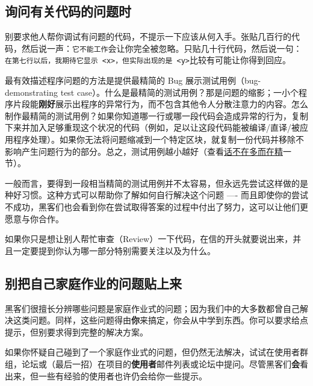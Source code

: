 \documentclass[titlepage]{article}
\begin{document}
\hypertarget{ux8be2ux95eeux6709ux5173ux4ee3ux7801ux7684ux95eeux9898ux65f6}{\subsection{询问有关代码的问题时}\label{ux8be2ux95eeux6709ux5173ux4ee3ux7801ux7684ux95eeux9898ux65f6}}

别要求他人帮你调试有问题的代码，不提示一下应该从何入手。张贴几百行的代码，然后说一声：\texttt{它不能工作}会让你完全被忽略。只贴几十行代码，然后说一句：\texttt{在第七行以后，我期待它显示\ \textless{}x\textgreater{}，但实际出现的是\ \textless{}y\textgreater{}}比较有可能让你得到回应。

最有效描述程序问题的方法是提供最精简的 Bug
展示测试用例（bug-demonstrating test
case）。什么是最精简的测试用例？那是问题的缩影；一小个程序片段能\textbf{刚好}展示出程序的异常行为，而不包含其他令人分散注意力的内容。怎么制作最精简的测试用例？如果你知道哪一行或哪一段代码会造成异常的行为，复制下来并加入足够重现这个状况的代码（例如，足以让这段代码能被编译/直译/被应用程序处理）。如果你无法将问题缩减到一个特定区块，就复制一份代码并移除不影响产生问题行为的部分。总之，测试用例越小越好（查看\protect\hyperlink{ux8bddux4e0dux5728ux591aux800cux5728ux7cbe}{话不在多而在精}一节）。

一般而言，要得到一段相当精简的测试用例并不太容易，但永远先尝试这样做的是种好习惯。这种方式可以帮助你了解如何自行解决这个问题
----
而且即使你的尝试不成功，黑客们也会看到你在尝试取得答案的过程中付出了努力，这可以让他们更愿意与你合作。

如果你只是想让别人帮忙审查（Review）一下代码，在信的开头就要说出来，并且一定要提到你认为哪一部分特别需要关注以及为什么。

\hypertarget{ux522bux628aux81eaux5df1ux5bb6ux5eadux4f5cux4e1aux7684ux95eeux9898ux8d34ux4e0aux6765}{\subsection{别把自己家庭作业的问题贴上来}\label{ux522bux628aux81eaux5df1ux5bb6ux5eadux4f5cux4e1aux7684ux95eeux9898ux8d34ux4e0aux6765}}

黑客们很擅长分辨哪些问题是家庭作业式的问题；因为我们中的大多数都曾自己解决这类问题。同样，这些问题得由\textbf{你}来搞定，你会从中学到东西。你可以要求给点提示，但别要求得到完整的解决方案。

如果你怀疑自己碰到了一个家庭作业式的问题，但仍然无法解决，试试在使用者群组，论坛或（最后一招）在项目的\textbf{使用者}邮件列表或论坛中提问。尽管黑客们\textbf{会}看出来，但一些有经验的使用者也许仍会给你一些提示。
\end{document}
